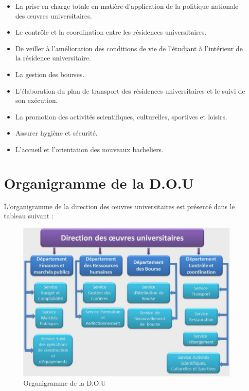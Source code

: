     \begin{itemize}
        \item La prise en charge totale en matière d’application de la politique nationale des œuvres universitaires.
        \item Le contrôle et la coordination entre les résidences universitaires.
        \item De veiller à l’amélioration des conditions de vie de l’étudiant à l’intérieur de la résidence universitaire.
        \item La gestion des bourses.
        \item L’élaboration du plan de transport des résidences universitaires et le suivi de son exécution.
        \item La promotion des activités scientifiques, culturelles, sportives et loisirs.
        \item Assurer hygiène et sécurité.
        \item L’accueil et l’orientation des nouveaux bacheliers.
    \end{itemize}

\section{Organigramme de la D.O.U}
    L’organigramme de la direction des œuvres universitaires est présenté dans le tableau suivant \cite{onou} :
    \begin{figure}[H]
        \centering
            \includegraphics[scale=0.4]{chapitre1/direction-diag.jpg}
        \caption{Organigramme de la D.O.U}
    \end{figure} 

